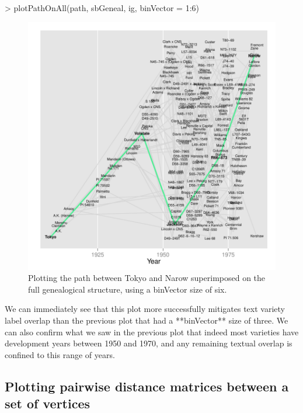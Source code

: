 \documentclass{article}
\numberwithin{equation}{section} %
\begin{document}
\begin{Schunk}
\begin{Sinput}
> plotPathOnAll(path, sbGeneal, ig, binVector = 1:6)
\end{Sinput}
\end{Schunk}

\begin{figure} 
  \begin{center} 
\includegraphics{ggenealogy-plotPathOnAll2}
\end{center} 
\caption{Plotting the path between Tokyo and Narow superimposed on the full genealogical structure, using a binVector size of six.}
\label{fig:plotPathOnAll2}
\end{figure}

We can immediately see that this plot more successfully mitigates text variety label overlap than the previous plot that had a **binVector** size of three. We can also confirm what we saw in the previous plot that indeed most varieties have development years between 1950 and 1970, and any remaining textual overlap is confined to this range of years.

\subsection{Plotting pairwise distance matrices between a set of vertices}
\end{document}
